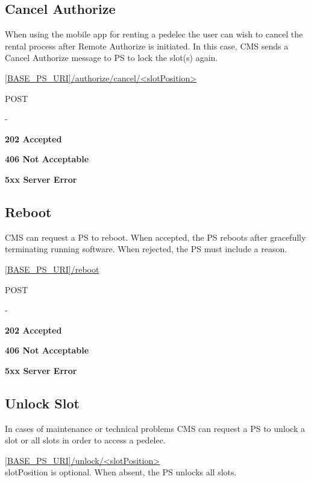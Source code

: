 \subsection{Cancel Authorize}

When using the mobile app for renting a pedelec the user can wish to cancel the rental process after Remote Authorize is initiated. In this case, \acs{CMS} sends a Cancel Authorize message to \acs{PS} to lock the slot(s) again.

 \url{[BASE_PS_URI]/authorize/cancel/<slotPosition>}

 POST

 -

 \textbf{202 Accepted}

 \textbf{406 Not Acceptable}

\textbf{5xx Server Error}

\subsection{Reboot}

\acs{CMS} can request a \acs{PS} to reboot. When accepted, the \acs{PS} reboots after gracefully terminating running software. When rejected, the \acs{PS} must include a reason.

 \url{[BASE_PS_URI]/reboot}

 POST

 -

 \textbf{202 Accepted}

 \textbf{406 Not Acceptable}

\textbf{5xx Server Error}

\subsection{Unlock Slot}

In cases of maintenance or technical problems \acs{CMS} can request a \acs{PS} to unlock a slot or all slots in order to access a pedelec. 

 \url{[BASE_PS_URI]/unlock/<slotPosition>} \\
slotPosition is optional. When absent, the \acs{PS} unlocks all slots.

